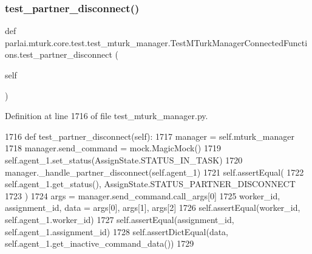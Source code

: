 \subsubsection{\texorpdfstring{test\+\_\+partner\+\_\+disconnect()}{test\_partner\_disconnect()}}
{\footnotesize\ttfamily def parlai.\+mturk.\+core.\+test.\+test\+\_\+mturk\+\_\+manager.\+Test\+M\+Turk\+Manager\+Connected\+Functions.\+test\+\_\+partner\+\_\+disconnect (\begin{DoxyParamCaption}\item[{}]{self }\end{DoxyParamCaption})}



Definition at line 1716 of file test\+\_\+mturk\+\_\+manager.\+py.


\begin{DoxyCode}
1716     \textcolor{keyword}{def }test\_partner\_disconnect(self):
1717         manager = self.mturk\_manager
1718         manager.send\_command = mock.MagicMock()
1719         self.agent\_1.set\_status(AssignState.STATUS\_IN\_TASK)
1720         manager.\_handle\_partner\_disconnect(self.agent\_1)
1721         self.assertEqual(
1722             self.agent\_1.get\_status(), AssignState.STATUS\_PARTNER\_DISCONNECT
1723         )
1724         args = manager.send\_command.call\_args[0]
1725         worker\_id, assignment\_id, data = args[0], args[1], args[2]
1726         self.assertEqual(worker\_id, self.agent\_1.worker\_id)
1727         self.assertEqual(assignment\_id, self.agent\_1.assignment\_id)
1728         self.assertDictEqual(data, self.agent\_1.get\_inactive\_command\_data())
1729 
\end{DoxyCode}
\mbox{\label{classparlai_1_1mturk_1_1core_1_1test_1_1test__mturk__manager_1_1TestMTurkManagerConnectedFunctions_a091363488873435da60a53e24023ea14}} 
